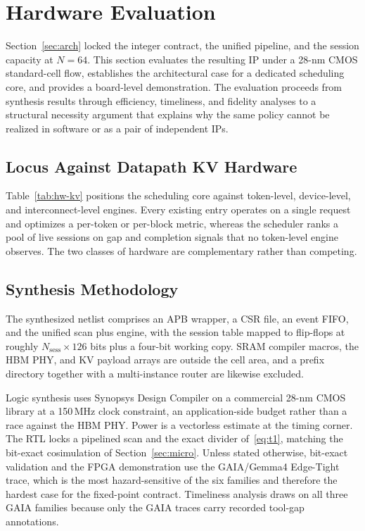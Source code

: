 \section{Hardware Evaluation}
\label{sec:hweval}

Section~\ref{sec:arch} locked the integer contract, the unified
pipeline, and the session capacity at $N{=}64$. This section evaluates
the resulting IP under a 28-nm CMOS standard-cell flow, establishes the
architectural case for a dedicated scheduling core, and provides a
board-level demonstration. The evaluation proceeds from synthesis
results through efficiency, timeliness, and fidelity analyses to a
structural necessity argument that explains why the same policy cannot
be realized in software or as a pair of independent IPs.

\subsection{Locus Against Datapath KV Hardware}
\label{sec:hw-locus}

Table~\ref{tab:hw-kv} positions the \unison scheduling core against
token-level, device-level, and interconnect-level engines. Every
existing entry operates on a single request and optimizes a per-token
or per-block metric, whereas the scheduler ranks a pool of live
sessions on gap and completion signals that no token-level engine
observes. The two classes of hardware are complementary rather than
competing.



\subsection{Synthesis Methodology}
\label{sec:hw-method}

The synthesized netlist comprises an APB wrapper, a CSR file, an event
FIFO, and the unified \spear scan plus \tide engine, with the session
table mapped to flip-flops at roughly $N_{\mathrm{sess}}\times 126$
bits plus a four-bit \tide working copy. SRAM compiler macros, the HBM
PHY, and KV payload arrays are outside the cell area, and a prefix
directory together with a multi-instance router are likewise excluded.

Logic synthesis uses Synopsys Design Compiler on a commercial 28-nm
CMOS library at a 150\,MHz clock constraint, an application-side
budget rather than a race against the HBM PHY. Power is a vectorless
estimate at the timing corner. The RTL locks a pipelined scan and the
exact divider of~\eqref{eq:t1}, matching the bit-exact cosimulation of
Section~\ref{sec:micro}. Unless stated otherwise, bit-exact validation
and the FPGA demonstration use the GAIA/Gemma4 Edge-Tight trace, which
is the most hazard-sensitive of the six families and therefore the
hardest case for the fixed-point contract. Timeliness analysis draws on
all three GAIA families because only the GAIA traces carry recorded
tool-gap annotations.

